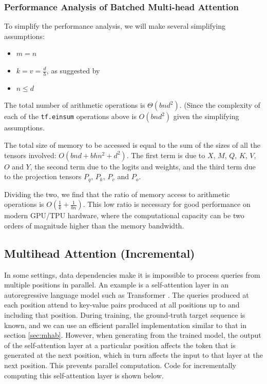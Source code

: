 \documentclass{article}
\begin{document}
\subsubsection{Performance Analysis of Batched Multi-head Attention} \label{sec:assu}
To simplify the performance analysis, we will make several simplifying assumptions:
\begin{itemize}
    \item $m = n$
    \item $k = v = \frac{d}{h}$, as suggested by \citep{Vas17}
    \item $n \leq d$
\end{itemize}

The total number of arithmetic operations is $\Theta(bnd^2)$.  (Since the complexity of each of the \texttt{tf.einsum} operations above is $O(bnd^2)$ given the simplifying assumptions.

The total size of memory to be accessed is equal to the sum of the sizes of all the tensors involved: $O(bnd + bhn^2 + d^2)$.  The first term is due to $X$, $M$, $Q$, $K$, $V$, $O$ and $Y$, the second term due to the logits and weights, and the third term due to the projection tensors $P_q$, $P_k$, $P_v$ and $P_o$.

Dividing the two, we find that the ratio of memory access to arithmetic operations is $O(\frac{1}{k} + \frac{1}{bn})$.  This low ratio is necessary for good performance on modern GPU/TPU hardware, where the computational capacity can be two orders of magnitude higher than the memory bandwidth.

\subsection{Multihead Attention (Incremental)}

In some settings, data dependencies make it is impossible to process queries from multiple positions in parallel.  An example is a self-attention layer in an autoregressive language model such as Transformer \citep{Vas17}.  The queries produced at each position attend to key-value pairs produced at all positions up to and including that position.  During training, the ground-truth target sequence is known, and we can use an efficient parallel implementation similar to that in section \ref{sec:mhab}.  However, when generating from the trained model, the output of the self-attention layer at a particular position affects the token that is generated at the next position, which in turn affects the input to that layer at the next position.   This prevents parallel computation.  Code for incrementally computing this self-attention layer is shown below.
\end{document}
